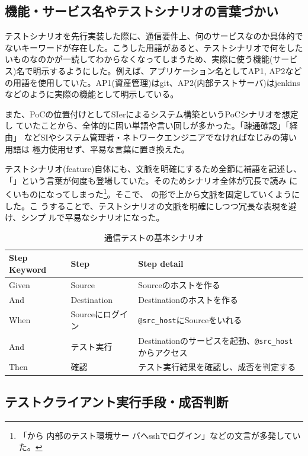   \subsection{機能・サービス名やテストシナリオの言葉づかい}

テストシナリオを先行実装した際に、通信要件上、何のサービスなのか具体的で
ないキーワードが存在した。こうした用語があると、テストシナリオで何をした
いものなのかが一読してわからなくなってしまうため、実際に使う機能(サービ
ス)名で明示するようにした。例えば、アプリケーション名としてAP1, AP2など
の用語を使用していた。AP1(資産管理)はgit、AP2(内部テストサーバ)はjenkins
などのように実際の機能として明示している。

また、PoCの位置付けとしてSIerによるシステム構築というPoCシナリオを想定し
ていたことから、全体的に固い単語や言い回しが多かった。「疎通確認」「経由」
などSIやシステム管理者・ネトワークエンジニアでなければなじみの薄い用語は
極力使用せず、平易な言葉に置き換えた。

テストシナリオ(feature)自体にも、文脈を明確にするため全節に補語を記述し、
「\yo 」という言葉が何度も登場していた。そのためシナリオ全体が冗長で読み
にくいものになってしまった\footnote{「\yo から \yo 内部のテスト環境サー
バへsshでログイン」などの文言が多発していた。}。そこで、
の形で上から文脈を固定していくようにした。こ
うすることで、テストシナリオの文脈を明確にしつつ冗長な表現を避け、シンプ
ルで平易なシナリオになった。
\begin{table}[h]
 \centering
 \caption{通信テストの基本シナリオ}
 \label{tab:basic_scenario}
 \begin{tabular}[t]{l|l|l}
  \hline
  Step Keyword & Step & Step detail \\
  \hline
  \hline
  Given & Source & Sourceのホストを作る \\
  And   & Destination & Destinationのホストを作る \\
  When  & Sourceにログイン & \verb|@src_host|にSourceをいれる \\
  And   & テスト実行 & Destinationのサービスを起動、\verb|@src_host|からアクセス \\
  Then & 確認 & テスト実行結果を確認し、成否を判定する \\
  \hline
 \end{tabular}
\end{table}


  \subsection{テストクライアント実行手段・成否判断}
  \label{sec:test-client-exec}

